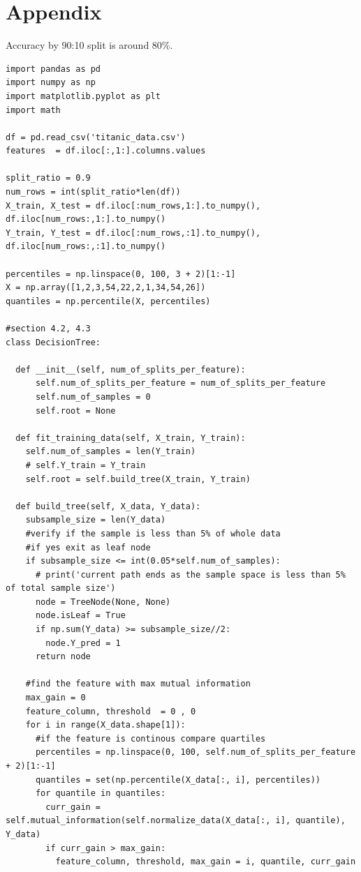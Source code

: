 \documentclass{article}
\begin{document}
\section{Appendix}
Accuracy by 90:10 split is around 80\%. \\
\begin{lstlisting}
import pandas as pd
import numpy as np
import matplotlib.pyplot as plt
import math

df = pd.read_csv('titanic_data.csv')
features  = df.iloc[:,1:].columns.values

split_ratio = 0.9
num_rows = int(split_ratio*len(df))
X_train, X_test = df.iloc[:num_rows,1:].to_numpy(), df.iloc[num_rows:,1:].to_numpy()
Y_train, Y_test = df.iloc[:num_rows,:1].to_numpy(), df.iloc[num_rows:,:1].to_numpy()

percentiles = np.linspace(0, 100, 3 + 2)[1:-1]
X = np.array([1,2,3,54,22,2,1,34,54,26])
quantiles = np.percentile(X, percentiles)

#section 4.2, 4.3
class DecisionTree:

  def __init__(self, num_of_splits_per_feature):
      self.num_of_splits_per_feature = num_of_splits_per_feature
      self.num_of_samples = 0
      self.root = None

  def fit_training_data(self, X_train, Y_train):
    self.num_of_samples = len(Y_train)
    # self.Y_train = Y_train
    self.root = self.build_tree(X_train, Y_train)
  
  def build_tree(self, X_data, Y_data):
    subsample_size = len(Y_data)
    #verify if the sample is less than 5% of whole data
    #if yes exit as leaf node
    if subsample_size <= int(0.05*self.num_of_samples):
      # print('current path ends as the sample space is less than 5% of total sample size')
      node = TreeNode(None, None)
      node.isLeaf = True
      if np.sum(Y_data) >= subsample_size//2:
        node.Y_pred = 1
      return node

    #find the feature with max mutual information  
    max_gain = 0
    feature_column, threshold  = 0 , 0
    for i in range(X_data.shape[1]):
      #if the feature is continous compare quartiles 
      percentiles = np.linspace(0, 100, self.num_of_splits_per_feature + 2)[1:-1]
      quantiles = set(np.percentile(X_data[:, i], percentiles))
      for quantile in quantiles:
        curr_gain = self.mutual_information(self.normalize_data(X_data[:, i], quantile), Y_data)
        if curr_gain > max_gain:
          feature_column, threshold, max_gain = i, quantile, curr_gain
    

\end{lstlisting}
\end{document}
